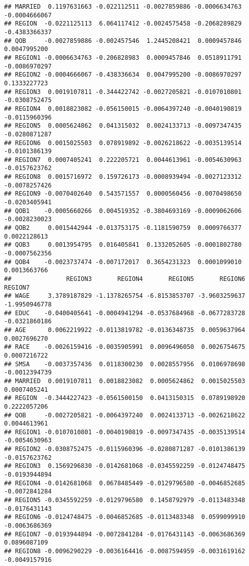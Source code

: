 \documentclass[
]{article}
\begin{document}
\begin{verbatim}
## MARRIED  0.1197631663 -0.022112511 -0.0027859886 -0.0006634763 -0.0004666067
## REGION  -0.0221125113  6.064117412 -0.0024575458 -0.2068289829 -0.4383366337
## QOB     -0.0027859886 -0.002457546  1.2445208421  0.0009457846  0.0047995200
## REGION1 -0.0006634763 -0.206828983  0.0009457846  0.0518911791 -0.0086970297
## REGION2 -0.0004666067 -0.438336634  0.0047995200 -0.0086970297  0.1333227723
## REGION3  0.0019107811 -0.344422742 -0.0027205821 -0.0107010801 -0.0308752475
## REGION4  0.0018823082 -0.056150015 -0.0064397240 -0.0040190819 -0.0115960396
## REGION5  0.0005624862  0.041315032  0.0024133713 -0.0097347435 -0.0280871287
## REGION6  0.0015025503  0.078919892 -0.0026218622 -0.0035139514 -0.0101386139
## REGION7  0.0007405241  0.222205721  0.0044613961 -0.0054630963 -0.0157623762
## REGION8  0.0015716972  0.159726173 -0.0008939494 -0.0027123312 -0.0078257426
## REGION9 -0.0070402640  0.543571557  0.0000560456 -0.0070498650 -0.0203405941
## QOB1    -0.0005660266  0.004519352 -0.3804693169 -0.0009062606 -0.0028230023
## QOB2     0.0015442944 -0.013753175 -0.1181590759  0.0009766377  0.0022128613
## QOB3     0.0013954795  0.016405841  0.1332052605 -0.0001802780 -0.0007562356
## QOB4    -0.0023737474 -0.007172017  0.3654231323  0.0001099010  0.0013663766
##               REGION3       REGION4       REGION5       REGION6       REGION7
## WAGE     3.3789187829 -1.1378265754 -6.8153853707 -3.9603259637 -1.9950946778
## EDUC    -0.0400405641 -0.0004941294 -0.0537684968 -0.0677283728 -0.0321860186
## AGE      0.0062219922 -0.0113819782 -0.0136348735  0.0059637964  0.0027696270
## RACE    -0.0026159416 -0.0035905991  0.0096496050  0.0026754675  0.0007216722
## SMSA    -0.0037357436  0.0118300230  0.0028557956  0.0106978698 -0.0012394739
## MARRIED  0.0019107811  0.0018823082  0.0005624862  0.0015025503  0.0007405241
## REGION  -0.3444227423 -0.0561500150  0.0413150315  0.0789198920  0.2222057206
## QOB     -0.0027205821 -0.0064397240  0.0024133713 -0.0026218622  0.0044613961
## REGION1 -0.0107010801 -0.0040190819 -0.0097347435 -0.0035139514 -0.0054630963
## REGION2 -0.0308752475 -0.0115960396 -0.0280871287 -0.0101386139 -0.0157623762
## REGION3  0.1569296830 -0.0142681068 -0.0345592259 -0.0124748475 -0.0193944894
## REGION4 -0.0142681068  0.0678485449 -0.0129796580 -0.0046852685 -0.0072841284
## REGION5 -0.0345592259 -0.0129796580  0.1458792979 -0.0113483348 -0.0176431143
## REGION6 -0.0124748475 -0.0046852685 -0.0113483348  0.0599099910 -0.0063686369
## REGION7 -0.0193944894 -0.0072841284 -0.0176431143 -0.0063686369  0.0896087109
## REGION8 -0.0096290229 -0.0036164416 -0.0087594959 -0.0031619162 -0.0049157916

\end{verbatim}
\end{document}
